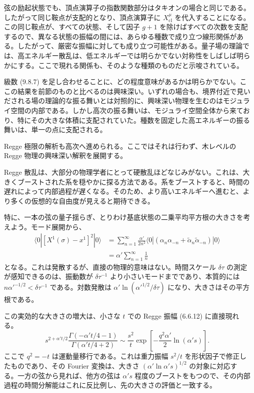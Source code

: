 弦の励起状態でも、頂点演算子の指数関数部分はタキオンの場合と同じである。したがって同じ鞍点が支配的となり、頂点演算子に $X_{\mathrm{cl}}^\mu$ を代入することになる。この同じ鞍点が、すべての状態、そして因子 $g+1$ を除けばすべての次数を支配するので、異なる状態の振幅の間には、あらゆる種数で成り立つ線形関係がある。したがって、厳密な振幅に対しても成り立つ可能性がある。量子場の理論では、高エネルギー散乱は、低エネルギーでは明らかでない対称性をしばしば明らかにする。ここで現れる関係も、そのような種類のものだと示唆されている。

級数 (9.8.7) を足し合わせることに、どの程度意味があるかは明らかでない。ここの結果を前節のものと比べるのは興味深い。いずれの場合も、境界付近で見いだされる場の理論的な振る舞いとは対照的に、興味深い物理を生むのはモジュライ空間の内部である。しかし高次の振る舞いは、モジュライ空間全体から来ており、特にその大きな体積に支配されていた。種数を固定した高エネルギーの振る舞いは、単一の点に支配される。


Regge 極限の解析も高次へ進められる。ここではそれは行わず、木レベルの Regge 物理の興味深い解釈を展開する。

Regge 散乱は、大部分の物理学者にとって硬散乱ほどなじみがない。これは、大きくブーストされた系を穏やかに探る方法である。系をブーストすると、時間の遅れによって内部過程が遅くなる。そのため、より高いエネルギーへ進むと、より多くの仮想的な自由度が見えると期待できる。

特に、一本の弦の量子揺らぎ、とりわけ基底状態の二乗平均平方根の大きさを考えよう。モード展開から、
\begin{equation}
\begin{split}
\langle0|[X^1(\sigma)-x^1]^2|0\rangle
&=\sum_{n=1}^{\infty}\frac{\alpha'}{2n^2}
\langle0|(\alpha_n\alpha_{-n}
+\widetilde\alpha_n\widetilde\alpha_{-n})|0\rangle\\
&=\alpha'\sum_{n=1}^{\infty}\frac1n
\end{split}
\tag{9.8.9}\label{eq:9.8.9}
\end{equation}
となる。これは発散するが、直接の物理的意味はない。時間スケール $\delta\tau$ の測定が感知できるのは、振動数が $\delta\tau^{-1}$ より小さいモードまでであり、本質的には $n\alpha'^{-1/2}<\delta\tau^{-1}$ である。対数発散は $\alpha'\ln(\alpha'^{1/2}/\delta\tau)$ になり、大きさはその平方根である。

この実効的な大きさの増大は、小さな $t$ での Regge 振幅 (6.6.12) に直接現れる。
\begin{equation}
s^{2+\alpha't/2}
\frac{\Gamma(-\alpha't/4-1)}{\Gamma(\alpha't/4+2)}
\sim\frac{s^2}{t}
\exp\left[-\frac{q^2\alpha'}2\ln(\alpha's)\right].
\tag{9.8.10}\label{eq:9.8.10}
\end{equation}
ここで $q^2=-t$ は運動量移行である。これは重力振幅 $s^2/t$ を形状因子で修正したものであり、その Fourier 変換は、大きさ $(\alpha'\ln\alpha's)^{1/2}$ の対象に対応する。一方の弦から見れば、他方の弦は $\alpha's$ 程度のブーストをもつので、その内部過程の時間分解能はこれに反比例し、先の大きさの評価と一致する。

